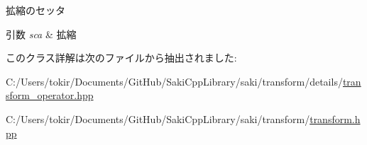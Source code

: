 拡縮のセッタ 


\begin{DoxyParams}{引数}
{\em sca} & 拡縮 \\
\hline
\end{DoxyParams}


このクラス詳解は次のファイルから抽出されました\+:\begin{DoxyCompactItemize}
\item 
C\+:/\+Users/tokir/\+Documents/\+Git\+Hub/\+Saki\+Cpp\+Library/saki/transform/details/\mbox{\hyperlink{transform__operator_8hpp}{transform\+\_\+operator.\+hpp}}\item 
C\+:/\+Users/tokir/\+Documents/\+Git\+Hub/\+Saki\+Cpp\+Library/saki/transform/\mbox{\hyperlink{transform_2transform_8hpp}{transform.\+hpp}}\end{DoxyCompactItemize}
